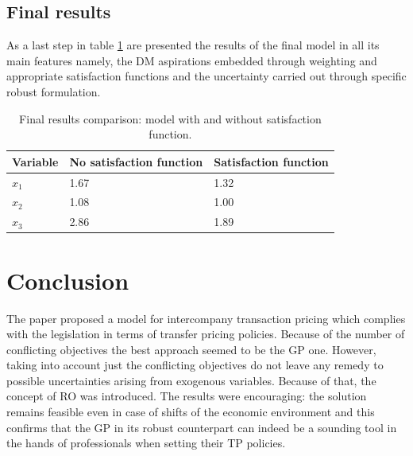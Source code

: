 \documentclass[conference,final,]{IEEEtran}
\begin{document}
\hypertarget{final-results}{%
  \subsection{Final results}\label{conclusion}}
As a last step in table \ref{res-final} are presented the results of the final model in all its main features namely, the DM aspirations embedded through weighting and appropriate satisfaction functions and the uncertainty carried out through specific robust formulation.
\begin{table}[]
\centering
\caption{Final results comparison: model with and without satisfaction function.}
\label{res-final}
\begin{tabular}{@{}lll@{}}
\toprule
  Variable          & No satisfaction function & Satisfaction function \\ \midrule
  $x_1$      & 1.67   & 1.32   \\ 
  $x_2$      & 1.08   & 1.00    \\
  $x_3$      & 2.86   & 1.89     \\\bottomrule
\end{tabular}
\end{table}
 
\hypertarget{conclusion}{%
\section{Conclusion}\label{conclusion}}
The paper proposed a model for intercompany transaction pricing which complies with the legislation in terms of transfer pricing policies. Because of the number of conflicting objectives the best approach seemed to be the GP one. However, taking into account just the conflicting objectives do not leave any remedy to possible uncertainties arising from exogenous variables. Because of that, the concept of RO was introduced. The results were encouraging: the solution remains feasible even in case of shifts of the economic environment and this confirms that the GP in its robust counterpart can indeed be a sounding tool in the hands of professionals when setting their TP policies.

 


\end{document}
